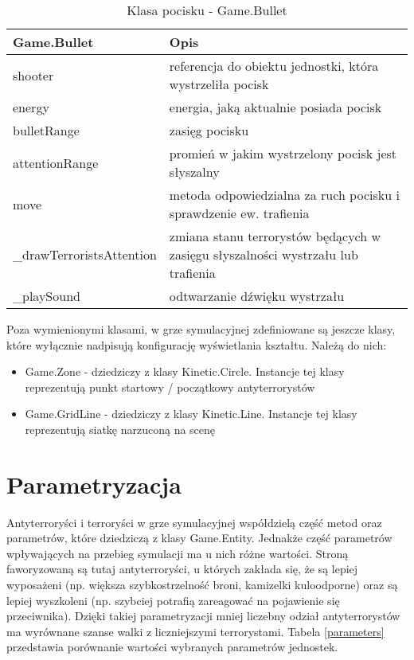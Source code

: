 \begin{table}
\begin{center}
\begin{tabular}{|p{}|p{}|}
\hline
\textbf{Game.Bullet} & Opis\\\hline		
	shooter & referencja do obiektu jednostki,  która wystrzeliła pocisk\\
	energy & energia, jaką aktualnie posiada pocisk\\
	bulletRange & zasięg pocisku\\	
	attentionRange & promień w jakim wystrzelony pocisk jest słyszalny
\\\hline
	move & metoda odpowiedzialna za ruch pocisku i sprawdzenie ew. trafienia\\
	\_drawTerroristsAttention & zmiana stanu terrorystów będących w zasięgu słyszalności wystrzału lub trafienia\\
	\_playSound & odtwarzanie dźwięku wystrzału
\\\hline
\end{tabular}
\caption {Klasa pocisku - Game.Bullet\label{objectsGameBullet}}
\end{center}
\end{table} 
\clearpage
Poza wymienionymi klasami, w grze symulacyjnej zdefiniowane są jeszcze klasy, które wyłącznie nadpisują konfigurację wyświetlania kształtu. Należą do nich:
\begin{itemize}
	\item Game.Zone - dziedziczy z klasy Kinetic.Circle. Instancje tej klasy reprezentują punkt startowy / początkowy antyterrorystów
	\item Game.GridLine - dziedziczy z klasy Kinetic.Line. Instancje tej klasy reprezentują siatkę narzuconą na scenę
\end{itemize}

\section{Parametryzacja}

Antyterroryści i terroryści w grze symulacyjnej współdzielą część metod oraz parametrów, które dziedziczą z klasy Game.Entity. Jednakże część parametrów wpływających na przebieg symulacji ma u nich różne wartości. Stroną faworyzowaną są tutaj antyterroryści, u których zakłada się, że są lepiej wyposażeni (np. większa szybkostrzelność broni, kamizelki kuloodporne) oraz są lepiej wyszkoleni (np. szybciej potrafią zareagować na pojawienie się przeciwnika). Dzięki takiej parametryzacji mniej liczebny odział antyterrorystów ma wyrównane szanse walki z liczniejszymi terrorystami. Tabela \ref{parameters} przedstawia porównanie wartości wybranych parametrów jednostek.

